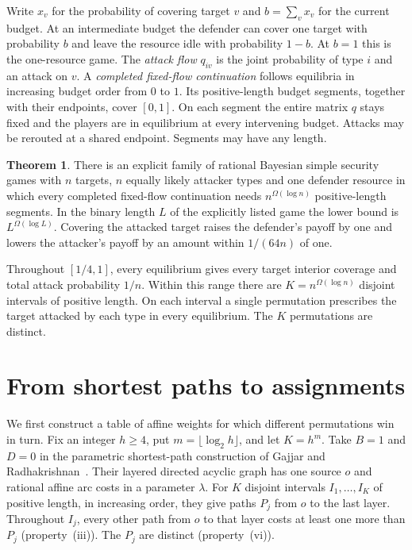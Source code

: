 \documentclass[11pt,letterpaper]{article}
\theoremstyle{definition}
\newtheorem{theorem}{Theorem}
\begin{document}
Write \(x_v\) for the probability of covering target \(v\) and \(b=\sum_v x_v\)
for the current budget. At an intermediate budget the defender can cover
one target with probability \(b\) and leave the resource idle with probability
\(1-b\). At \(b=1\) this is the one-resource game. The \emph{attack flow}
\(q_{iv}\) is the joint probability of type \(i\) and an attack on \(v\).
A \emph{completed fixed-flow continuation} follows equilibria in increasing
budget order from \(0\) to \(1\). Its positive-length budget segments,
together with their endpoints, cover \([0,1]\). On each segment the entire
matrix \(q\) stays fixed and the players are in equilibrium at every
intervening budget. Attacks may be rerouted at a shared endpoint. Segments
may have any length.

\begin{theorem}\label{thm:main}
There is an explicit family of rational Bayesian simple security games with
\(n\) targets, \(n\) equally likely attacker types and one defender resource
in which every completed fixed-flow continuation needs \(n^{\Omega(\log n)}\)
positive-length segments. In the binary length \(L\) of the explicitly
listed game the lower bound is \(L^{\Omega(\log L)}\). Covering the attacked
target raises the defender's payoff by one and lowers the attacker's payoff
by an amount within \(1/(64n)\) of one.

Throughout \([1/4,1]\), every equilibrium gives every target interior
coverage and total attack probability \(1/n\). Within this range there are
\(K=n^{\Omega(\log n)}\) disjoint intervals of positive length. On each
interval a single permutation prescribes the target attacked by each type
in every equilibrium. The \(K\) permutations are distinct.
\end{theorem}

\section{From shortest paths to assignments}\label{sec:paths}

We first construct a table of affine weights for which different permutations
win in turn. Fix an integer \(h\ge4\), put \(m=\lfloor\log_2 h\rfloor\), and
let \(K=h^m\). Take \(B=1\) and \(D=0\) in the parametric shortest-path
construction of Gajjar and Radhakrishnan~\cite[Lemma~14 and proof of
Theorem~1]{GR}. Their layered directed acyclic graph has one source \(o\)
and rational affine arc costs in a parameter \(\lambda\). For \(K\) disjoint
intervals \(I_1,\ldots,I_K\) of positive length, in increasing order, they
give paths \(P_j\) from \(o\) to the last layer. Throughout \(I_j\), every
other path from \(o\) to that layer costs at least one more than \(P_j\)
(property~(iii)). The \(P_j\) are distinct (property~(vi)).
\end{document}
